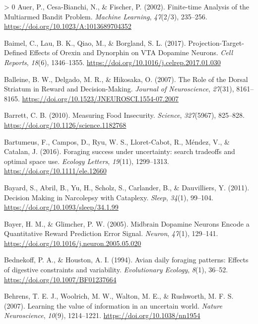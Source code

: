 \documentclass[
]{/home/nicoluarte/Downloads/templates/PNAS-template-main.tex}
\newlength{\cslhangindent}
\newenvironment{CSLReferences}[3] %
 {%
  \setlength{\parindent}{0pt}
  \ifodd #1 \everypar{\setlength{\hangindent}{\cslhangindent}}\ignorespaces\fi
  \ifnum #2 > 0
  \setlength{\parskip}{#2\baselineskip}
  \fi
 }%
 {}
\begin{document}
\begin{CSLReferences}{1}{0}
\leavevmode\hypertarget{ref-NXA58KQ4}{}%
Auer, P., Cesa-Bianchi, N., \& Fischer, P. (2002). Finite-time Analysis
of the Multiarmed Bandit Problem. \emph{Machine Learning},
\emph{47}(2/3), 235--256. \url{https://doi.org/10.1023/A:1013689704352}

\leavevmode\hypertarget{ref-XIJMRM6S}{}%
Baimel, C., Lau, B. K., Qiao, M., \& Borgland, S. L. (2017).
Projection-Target-Defined Effects of Orexin and Dynorphin on VTA
Dopamine Neurons. \emph{Cell Reports}, \emph{18}(6), 1346--1355.
\url{https://doi.org/10.1016/j.celrep.2017.01.030}

\leavevmode\hypertarget{ref-6JBBK7KQ}{}%
Balleine, B. W., Delgado, M. R., \& Hikosaka, O. (2007). The Role of the
Dorsal Striatum in Reward and Decision-Making. \emph{Journal of
Neuroscience}, \emph{27}(31), 8161--8165.
\url{https://doi.org/10.1523/JNEUROSCI.1554-07.2007}

\leavevmode\hypertarget{ref-X8KX96JF}{}%
Barrett, C. B. (2010). Measuring Food Insecurity. \emph{Science},
\emph{327}(5967), 825--828.
\url{https://doi.org/10.1126/science.1182768}

\leavevmode\hypertarget{ref-9XCDNBAM}{}%
Bartumeus, F., Campos, D., Ryu, W. S., Lloret-Cabot, R., Méndez, V., \&
Catalan, J. (2016). Foraging success under uncertainty: search tradeoffs
and optimal space use. \emph{Ecology Letters}, \emph{19}(11),
1299--1313. \url{https://doi.org/10.1111/ele.12660}

\leavevmode\hypertarget{ref-BGNECK7I}{}%
Bayard, S., Abril, B., Yu, H., Scholz, S., Carlander, B., \&
Dauvilliers, Y. (2011). Decision Making in Narcolepsy with Cataplexy.
\emph{Sleep}, \emph{34}(1), 99--104.
\url{https://doi.org/10.1093/sleep/34.1.99}

\leavevmode\hypertarget{ref-ZHGB75KH}{}%
Bayer, H. M., \& Glimcher, P. W. (2005). Midbrain Dopamine Neurons
Encode a Quantitative Reward Prediction Error Signal. \emph{Neuron},
\emph{47}(1), 129--141.
\url{https://doi.org/10.1016/j.neuron.2005.05.020}

\leavevmode\hypertarget{ref-LLLWQCZE}{}%
Bednekoff, P. A., \& Houston, A. I. (1994). Avian daily foraging
patterns: Effects of digestive constraints and variability.
\emph{Evolutionary Ecology}, \emph{8}(1), 36--52.
\url{https://doi.org/10.1007/BF01237664}

\leavevmode\hypertarget{ref-BHR2NAEI}{}%
Behrens, T. E. J., Woolrich, M. W., Walton, M. E., \& Rushworth, M. F.
S. (2007). Learning the value of information in an uncertain world.
\emph{Nature Neuroscience}, \emph{10}(9), 1214--1221.
\url{https://doi.org/10.1038/nn1954}


\end{CSLReferences}
\end{document}
